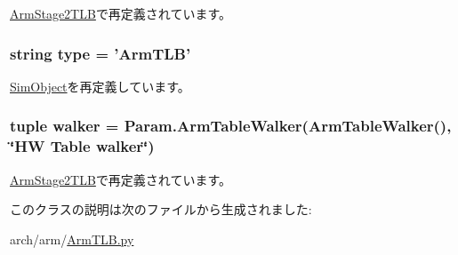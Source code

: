 \hyperlink{classArmTLB_1_1ArmStage2TLB_a439227feff9d7f55384e8780cfc2eb82}{ArmStage2TLB}で再定義されています。\hypertarget{classArmTLB_1_1ArmTLB_acce15679d830831b0bbe8ebc2a60b2ca}{
\subsubsection[{type}]{\setlength{\rightskip}{0pt plus 5cm}string {\bf type} = '{\bf ArmTLB}'}}
\label{classArmTLB_1_1ArmTLB_acce15679d830831b0bbe8ebc2a60b2ca}


\hyperlink{classm5_1_1SimObject_1_1SimObject_acce15679d830831b0bbe8ebc2a60b2ca}{SimObject}を再定義しています。\hypertarget{classArmTLB_1_1ArmTLB_a38c6e2cd4db9b456da7637543e59ccbe}{
\subsubsection[{walker}]{\setlength{\rightskip}{0pt plus 5cm}tuple {\bf walker} = Param.ArmTableWalker({\bf ArmTableWalker}(), \char`\"{}HW Table {\bf walker}\char`\"{})}}
\label{classArmTLB_1_1ArmTLB_a38c6e2cd4db9b456da7637543e59ccbe}


\hyperlink{classArmTLB_1_1ArmStage2TLB_a38c6e2cd4db9b456da7637543e59ccbe}{ArmStage2TLB}で再定義されています。

このクラスの説明は次のファイルから生成されました:\begin{DoxyCompactItemize}
\item 
arch/arm/\hyperlink{ArmTLB_8py}{ArmTLB.py}\end{DoxyCompactItemize}
